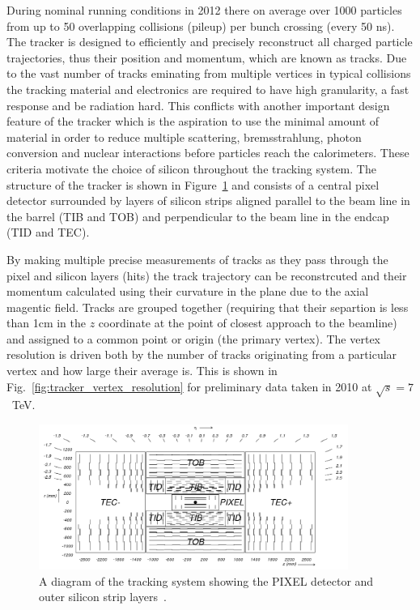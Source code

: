 During nominal \LHC running conditions in 2012 there on average over 1000 particles from up to 50 overlapping \pp collisions (pileup) per bunch crossing (every 50 ns). The tracker is designed to efficiently and precisely reconstruct all charged particle trajectories, thus their position and momentum, which are known as tracks. Due to the vast number of tracks eminating from multiple vertices in typical \LHC collisions the tracking material and electronics are required to have high granularity, a fast response and be radiation hard. This conflicts with another important design feature of the tracker which is the aspiration to use the minimal amount of material in order to reduce multiple scattering, bremsstrahlung, photon conversion and nuclear interactions before particles reach the calorimeters. These criteria motivate the choice of silicon throughout the \CMS tracking system. The structure of the \CMS tracker is shown in Figure~\ref{fig:cms_tracker} and consists of a central pixel detector surrounded by layers of silicon strips aligned parallel to the beam line in the barrel (TIB and TOB) and perpendicular to the beam line in the endcap (TID and TEC).

By making multiple precise measurements of tracks as they pass through the pixel and silicon layers (hits) the track trajectory can be reconstrcuted and their momentum calculated using their curvature in the \phi plane due to the axial magentic field. Tracks are grouped together (requiring that their separtion is less than 1cm in the $z$ coordinate at the point of closest approach to the beamline) and assigned to a common point or origin (the primary vertex). The vertex resolution is driven both by the number of tracks originating from a particular vertex and how large their average \pT is. This is shown in Fig.~\ref{fig:tracker_vertex_resolution} for preliminary data taken in 2010 at $\sqrt{s}=7$~TeV.

\begin{figure}
  \includegraphics[width=0.9\textwidth]{cms_experiment/plots/fig_cmstracker.png}
  \caption[CMS tracker]{A diagram of the \CMS tracking system showing the PIXEL detector and outer silicon strip layers~\cite{CMS_JINST}.}
  \label{fig:cms_tracker}
\end{figure}

